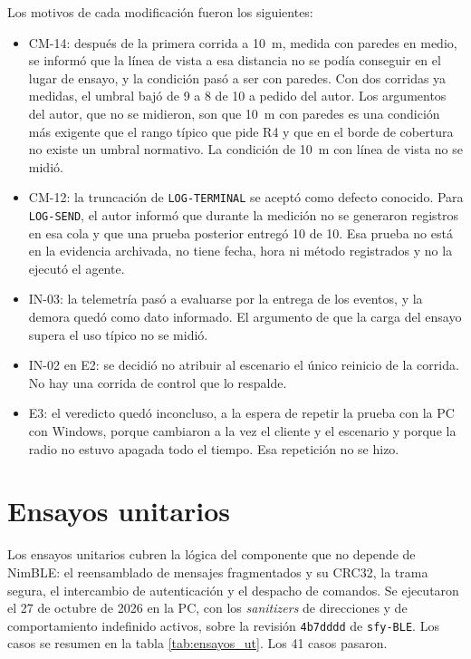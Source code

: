 Los motivos de cada modificación fueron los siguientes:

\begin{itemize}
\item CM-14: después de la primera corrida a 10~m, medida con paredes en medio, se informó que la línea de vista a esa distancia no se podía conseguir en el lugar de ensayo, y la condición pasó a ser con paredes. Con dos corridas ya medidas, el umbral bajó de 9 a 8 de 10 a pedido del autor. Los argumentos del autor, que no se midieron, son que 10~m con paredes es una condición más exigente que el rango típico que pide R4 y que en el borde de cobertura no existe un umbral normativo. La condición de 10~m con línea de vista no se midió.
\item CM-12: la truncación de \texttt{LOG-TERMINAL} se aceptó como defecto conocido. Para \texttt{LOG-SEND}, el autor informó que durante la medición no se generaron registros en esa cola y que una prueba posterior entregó 10 de 10. Esa prueba no está en la evidencia archivada, no tiene fecha, hora ni método registrados y no la ejecutó el agente.
\item IN-03: la telemetría pasó a evaluarse por la entrega de los eventos, y la demora quedó como dato informado. El argumento de que la carga del ensayo supera el uso típico no se midió.
\item IN-02 en E2: se decidió no atribuir al escenario el único reinicio de la corrida. No hay una corrida de control que lo respalde.
\item E3: el veredicto quedó inconcluso, a la espera de repetir la prueba con la PC con Windows, porque cambiaron a la vez el cliente y el escenario y porque la radio no estuvo apagada todo el tiempo. Esa repetición no se hizo.
\end{itemize}


\section{Ensayos unitarios}
\label{sec:ensayos_unitarios}

Los ensayos unitarios cubren la lógica del componente que no depende de NimBLE: el reensamblado de mensajes fragmentados y su CRC32, la trama segura, el intercambio de autenticación y el despacho de comandos. Se ejecutaron el 27 de octubre de 2026 en la PC, con los \textit{sanitizers} de direcciones y de comportamiento indefinido activos, sobre la revisión \texttt{4b7dddd} de \texttt{sfy-BLE}. Los casos se resumen en la tabla \ref{tab:ensayos_ut}. Los 41 casos pasaron.

